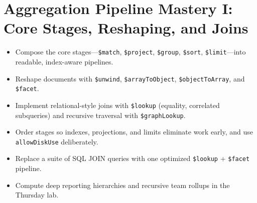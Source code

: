 \chapter{Aggregation Pipeline Mastery I: Core Stages, Reshaping, and Joins}
%

\begin{objectives}
\begin{itemize}
    \item Compose the core stages---\texttt{\$match}, \texttt{\$project}, \texttt{\$group}, \texttt{\$sort}, \texttt{\$limit}---into readable, index-aware pipelines.
    \item Reshape documents with \texttt{\$unwind}, \texttt{\$arrayToObject}, \texttt{\$objectToArray}, and \texttt{\$facet}.
    \item Implement relational-style joins with \texttt{\$lookup} (equality, correlated subqueries) and recursive traversal with \texttt{\$graphLookup}.
    \item Order stages so indexes, projections, and limits eliminate work early, and use \texttt{allowDiskUse} deliberately.
    \item Replace a suite of SQL JOIN queries with one optimized \texttt{\$lookup} + \texttt{\$facet} pipeline.
    \item Compute deep reporting hierarchies and recursive team rollups in the Thursday lab.
\end{itemize}
\end{objectives}

